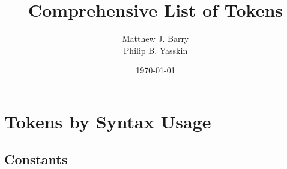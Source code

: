 \documentclass{article}
\begin{document}
  \title{Comprehensive List of Tokens}
  \author{Matthew J. Barry \\ Philip B. Yasskin}
  \date{\today}
  \maketitle
  
  \setlength{\parskip}{1em}
  
  \section{Tokens by Syntax Usage} %
  \label{sec:syntax}
  \subsection{Constants} %
  \label{sub:constants}
\end{document}
